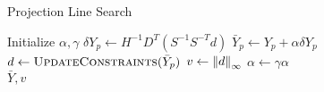 \documentclass[../root.tex]{subfiles}
\begin{document}
    \begin{algorithm}
        \begin{algorithmic}[1]
            \caption{Projection Line Search} \label{alg:pn_linesearch}
            \State Initialize $\alpha, \gamma$
                \State $\delta Y_p \leftarrow H^{-1} D^T (S^{-1}S^{-T} d)$
                \State $\bar{Y}_p \leftarrow Y_p + \alpha \delta Y_p$
                \State $d \leftarrow \textproc{UpdateConstraints}(\bar{Y}_p)$
                \State $v \leftarrow \norm{d}_\infty$
                \State $\alpha \leftarrow \gamma \alpha$
            \EndWhile \\
            \Return $\bar{Y}, v$
            \EndFunction
        \end{algorithmic}
    \end{algorithm}
\end{document}

